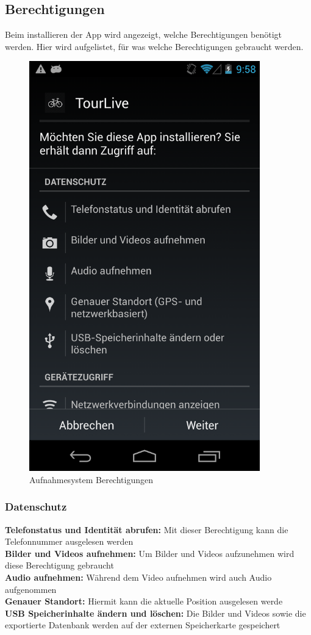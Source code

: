 \subsection{Berechtigungen}
Beim installieren der App wird angezeigt, welche Berechtigungen benötigt werden. Hier wird aufgelistet, für was welche Berechtigungen gebraucht werden.
\begin{figure}[H]
	\centering
	\includegraphics[width=100mm]{images/android/berechtigungen.png}
	\caption{Aufnahmesystem Berechtigungen}
\end{figure}
\subsubsection{Datenschutz}
\textbf{Telefonstatus und Identität abrufen:} Mit dieser Berechtigung kann die Telefonnummer ausgelesen werden\\
\textbf{Bilder und Videos aufnehmen:} Um Bilder und Videos aufzunehmen wird diese Berechtigung gebraucht\\
\textbf{Audio aufnehmen:} Während dem Video aufnehmen wird auch Audio aufgenommen\\
\textbf{Genauer Standort:} Hiermit kann die aktuelle Position ausgelesen werde\\
\textbf{USB Speicherinhalte ändern und löschen:} Die Bilder und Videos sowie die exportierte Datenbank werden auf der externen Speicherkarte gespeichert \\

